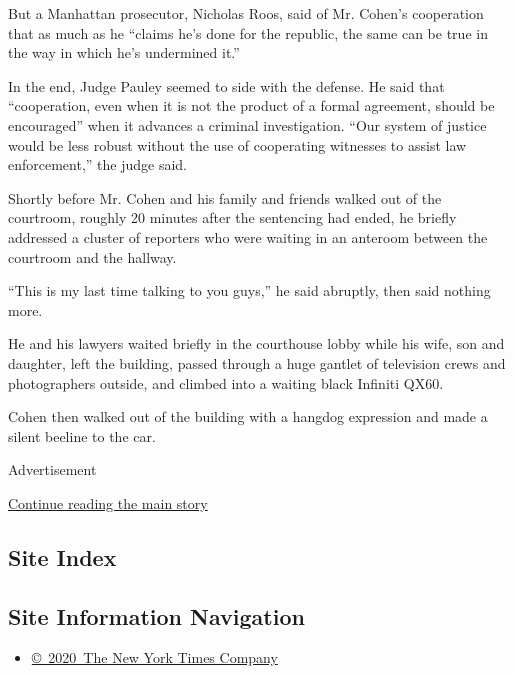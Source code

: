 But a Manhattan prosecutor, Nicholas Roos, said of Mr. Cohen's
cooperation that as much as he ``claims he's done for the republic, the
same can be true in the way in which he's undermined it.''

In the end, Judge Pauley seemed to side with the defense. He said that
``cooperation, even when it is not the product of a formal agreement,
should be encouraged'' when it advances a criminal investigation. ``Our
system of justice would be less robust without the use of cooperating
witnesses to assist law enforcement,'' the judge said.

Shortly before Mr. Cohen and his family and friends walked out of the
courtroom, roughly 20 minutes after the sentencing had ended, he briefly
addressed a cluster of reporters who were waiting in an anteroom between
the courtroom and the hallway.

``This is my last time talking to you guys,'' he said abruptly, then
said nothing more.

He and his lawyers waited briefly in the courthouse lobby while his
wife, son and daughter, left the building, passed through a huge gantlet
of television crews and photographers outside, and climbed into a
waiting black Infiniti QX60.

Cohen then walked out of the building with a hangdog expression and made
a silent beeline to the car.

Advertisement

\protect\hyperlink{after-bottom}{Continue reading the main story}

\hypertarget{site-index}{%
\subsection{Site Index}\label{site-index}}

\hypertarget{site-information-navigation}{%
\subsection{Site Information
Navigation}\label{site-information-navigation}}

\begin{itemize}
\tightlist
\item
  \href{https://help.nytimes3xbfgragh.onion/hc/en-us/articles/115014792127-Copyright-notice}{©~2020~The
  New York Times Company}
\end{itemize}

